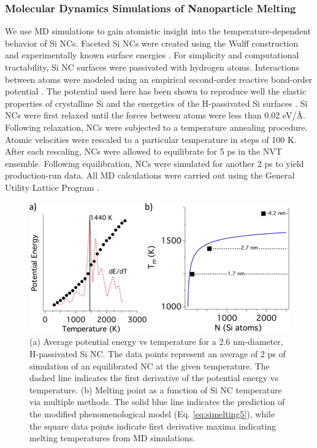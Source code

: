 \subsubsection{Molecular Dynamics Simulations of Nanoparticle Melting}
We use MD simulations to gain atomistic insight into the temperature-dependent behavior of Si NCs. Faceted Si NCs were created using the Wulff construction and experimentally known surface energies \cite{hong1998effect}. For simplicity and computational tractability, Si NC surfaces were passivated with hydrogen atoms. Interactions between atoms were modeled using an empirical second-order reactive bond-order potential \cite{schall2008elastic}. The potential used here has been shown to reproduce well the elastic properties of crystalline Si and the energetics of the H-passivated Si surfaces \cite{murty1995empirical}. Si NCs were first relaxed until the forces between atoms were less than 0.02 eV/\r{A}. Following relaxation, NCs were subjected to a temperature annealing procedure. Atomic velocities were rescaled to a particular temperature in steps of 100 K. After each rescaling, NCs were allowed to equilibrate for 5 ps in the NVT ensemble. Following equilibration, NCs were simulated for another 2 ps to yield production-run data. All MD calculations were carried out using the General Utility Lattice Program \cite{gale2003general}. \par

\begin{figure}
\begin{center}
\includegraphics[width=\textwidth]{./Chapter5/simelting1.jpeg}
\caption[MD simulations of Si NC melting for multiple NC sizes.]{(a) Average potential energy vs temperature for a 2.6 nm-diameter, H-passivated Si NC. The data points represent an average of 2 ps of simulation of an equilibrated NC at the given temperature. The dashed line indicates the first derivative of the potential energy vs temperature. (b) Melting point as a function of Si NC temperature via multiple methods. The solid blue line indicates the prediction of the modified phenomenological model (Eq. \ref{eq:simelting5}), while the square data points indicate first derivative maxima indicating melting temperatures from MD simulations.}
\label{f:simelting1}
\end{center}
\end{figure}

